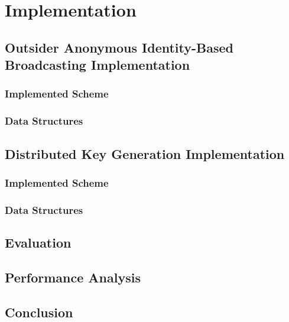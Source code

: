 \chapter{Implementation}
\label{cha:n}

\section{Outsider Anonymous Identity-Based Broadcasting Implementation}

\subsection{Implemented Scheme}

\subsection{Data Structures}

\section{Distributed Key Generation Implementation}

\subsection{Implemented Scheme}

\subsection{Data Structures}

\section{Evaluation}

\section{Performance Analysis}

\section{Conclusion}

